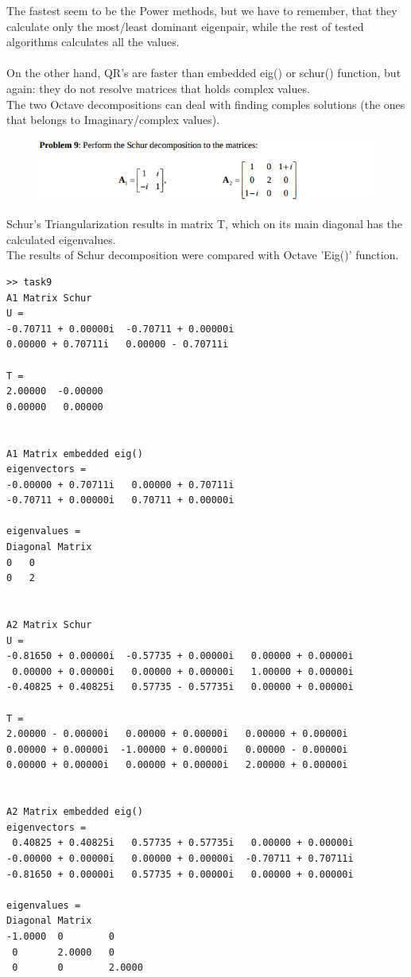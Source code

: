 \documentclass[eng,openany]{mgr}
\begin{document}
The fastest seem to be the Power methods, but we have to remember, that they calculate only the most/least dominant eigenpair, while the rest of tested algorithms calculates all the values.\\
\\
On the other hand, QR's are faster than embedded eig() or schur() function, but again: they do not resolve matrices that holds complex values.\\
The two Octave decompositions can deal with finding comples solutions (the ones that belongs to Imaginary/complex values).
\newpage
\begin{figure}[h]
\centering
\includegraphics[width=0.8\linewidth]{screenshot017}
\label{fig:screenshot017}
\end{figure}
Schur's Triangularization results in matrix T, which on its main diagonal has the calculated eigenvalues.\\
The results of Schur decomposition were compared with Octave 'Eig()' function.
\begin{lstlisting}
>> task9
A1 Matrix Schur
U =
-0.70711 + 0.00000i  -0.70711 + 0.00000i
0.00000 + 0.70711i   0.00000 - 0.70711i

T =
2.00000  -0.00000
0.00000   0.00000


A1 Matrix embedded eig()
eigenvectors =
-0.00000 + 0.70711i   0.00000 + 0.70711i
-0.70711 + 0.00000i   0.70711 + 0.00000i

eigenvalues =
Diagonal Matrix
0   0
0   2


A2 Matrix Schur
U =
-0.81650 + 0.00000i  -0.57735 + 0.00000i   0.00000 + 0.00000i
 0.00000 + 0.00000i   0.00000 + 0.00000i   1.00000 + 0.00000i
-0.40825 + 0.40825i   0.57735 - 0.57735i   0.00000 + 0.00000i

T =
2.00000 - 0.00000i   0.00000 + 0.00000i   0.00000 + 0.00000i
0.00000 + 0.00000i  -1.00000 + 0.00000i   0.00000 - 0.00000i
0.00000 + 0.00000i   0.00000 + 0.00000i   2.00000 + 0.00000i


A2 Matrix embedded eig()
eigenvectors =
 0.40825 + 0.40825i   0.57735 + 0.57735i   0.00000 + 0.00000i
-0.00000 + 0.00000i   0.00000 + 0.00000i  -0.70711 + 0.70711i
-0.81650 + 0.00000i   0.57735 + 0.00000i   0.00000 + 0.00000i

eigenvalues =
Diagonal Matrix
-1.0000  0        0
 0       2.0000   0
 0       0        2.0000
\end{lstlisting}
\end{document}
